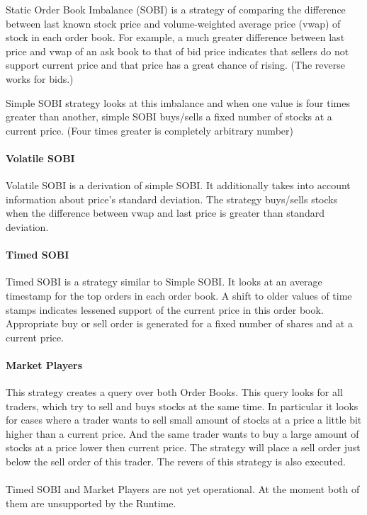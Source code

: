 \documentclass[14pt]{article}
\begin{document}
Static Order Book Imbalance (SOBI) is a strategy of comparing the difference between last known stock price and volume-weighted average price (vwap) of stock in each order book. For example, a much greater difference between last price and vwap of an ask book to that of bid price indicates that sellers do not support current price and that price has a great chance of rising. (The reverse works for bids.)

Simple SOBI strategy looks at this imbalance and when one value is four times greater than another, simple SOBI buys/sells a fixed number of stocks at a current price. (Four times greater is completely arbitrary number)

\paragraph{Volatile SOBI}

Volatile SOBI is a derivation of simple SOBI. It additionally takes into account information about price's standard deviation. The strategy buys/sells stocks when the difference between vwap and last price is greater than standard deviation.

\paragraph{Timed SOBI}

Timed SOBI is a strategy similar to Simple SOBI. It looks at an average timestamp for the top orders in each order book. A shift to older values of time stamps indicates lessened support of the current price in this order book. Appropriate buy or sell order is generated for a fixed number of shares and at a current price. 

\paragraph{Market Players}
 

This strategy creates a query over both Order Books. This query looks for all traders, which try to sell and buys stocks at the same time. In particular it looks for cases where a trader wants to sell small amount of stocks at a price a little bit higher than a current price. And the same trader wants to buy a large amount of stocks at a price lower then current price. The strategy will place a sell order just below the sell order of this trader. The revers of this strategy is also executed.
\\
\\
Timed SOBI and Market Players are not yet operational. At the moment both of them are unsupported by the Runtime.
\end{document}
